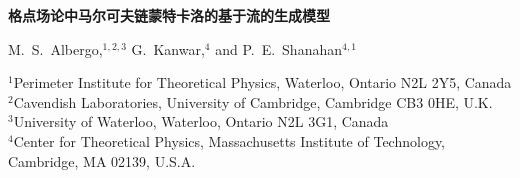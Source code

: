 \documentclass[11pt]{ctexart}
\begin{document}
\begin{center}
  {\LARGE\bfseries 格点场论中马尔可夫链蒙特卡洛的基于流的生成模型\par}
  \vspace{1.3em}
  {\large M.~S.~Albergo,$^{1,2,3}$ G.~Kanwar,$^{4}$ and P.~E.~Shanahan$^{4,1}$\par}
  \vspace{0.9em}
  {\small
   $^{1}$Perimeter Institute for Theoretical Physics, Waterloo, Ontario N2L 2Y5, Canada\\
   $^{2}$Cavendish Laboratories, University of Cambridge, Cambridge CB3 0HE, U.K.\\
   $^{3}$University of Waterloo, Waterloo, Ontario N2L 3G1, Canada\\
   $^{4}$Center for Theoretical Physics, Massachusetts Institute of Technology, Cambridge, MA 02139, U.S.A.\par}
\end{center}
\vspace{0.6em}

\begin{abstract}
本文提出一种在格点场论中进行蒙特卡洛采样的马尔可夫链更新方案，它使用一个机器学习的\emph{基于流的生成模型}。该生成模型可被优化（训练），以从近似于所研究理论的格点作用量所决定的期望玻尔兹曼分布中产生样本。对模型的训练能系统地改善马尔可夫链中的自相关时间，即便在标准马尔可夫链蒙特卡洛算法产生去关联更新时呈现临界慢化的参数区域也是如此。此外，该模型无需来自期望分布的现成样本即可训练。在二维 $\phi^4$ 理论中，将该算法与 HMC 及局域 Metropolis 抽样进行了比较。
\end{abstract}






\end{document}

